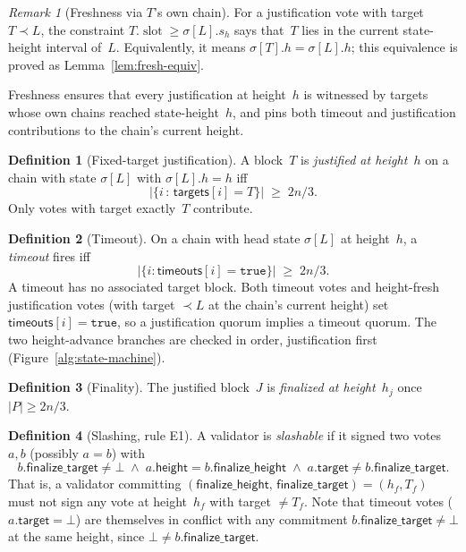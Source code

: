 \ifx\litemode\undefined\documentclass{article}\fi
\newcommand{\slot}[0]{\ensuremath{\operatorname{\mathrm{slot}}}}
\newcommand{\target}{\mathsf{target}}
\newcommand{\height}{\mathsf{height}}
\newcommand{\finalizeHeight}{\mathsf{finalize\_height}}
\newcommand{\finalizeTarget}{\mathsf{finalize\_target}}
\newcommand{\targets}{\mathsf{targets}}
\newcommand{\timeouts}{\mathsf{timeouts}}
\theoremstyle{plain}
\theoremstyle{definition}
\newtheorem{definition}{Definition}
\theoremstyle{remark}
\newtheorem{remark}[theorem]{Remark}
\begin{document}
\begin{remark}[Freshness via $T$'s own chain]
For a justification vote with target $T \prec L$, the constraint $T.\slot \geq \sigma[L].s_h$ says that~$T$ lies in the current state-height interval of~$L$.
Equivalently, it means $\sigma[T].h = \sigma[L].h$; this equivalence is proved as Lemma~\ref{lem:fresh-equiv}.
\end{remark}

Freshness ensures that every justification at height~$h$ is witnessed by targets whose own chains reached state-height~$h$, and pins both timeout and justification contributions to the chain's current height.

\begin{definition}[Fixed-target justification]\label{def:justification}
A block~$T$ is \emph{justified at height~$h$} on a chain with state $\sigma[L]$ with $\sigma[L].h = h$ iff
\[
  \bigl|\{i \,:\, \targets[i] = T\}\bigr| \;\geq\; 2n/3.
\]
Only votes with target exactly~$T$ contribute.
\end{definition}

\begin{definition}[Timeout]\label{def:timeout}
On a chain with head state $\sigma[L]$ at height~$h$, a \emph{timeout} fires iff
\[
  \bigl|\{i : \timeouts[i] = \mathtt{true}\}\bigr| \;\geq\; 2n/3.
\]
A timeout has no associated target block.
Both timeout votes and height-fresh justification votes (with target $\prec L$ at the chain's current height) set $\timeouts[i] = \mathtt{true}$, so a justification quorum implies a timeout quorum.
The two height-advance branches are checked in order, justification first (Figure~\ref{alg:state-machine}).
\end{definition}

\begin{definition}[Finality]\label{def:finality}
The justified block~$J$ is \emph{finalized at height~$h_j$} once $|P| \geq 2n/3$.
\end{definition}

\begin{definition}[Slashing, rule E1]\label{def:slashing}
A validator is \emph{slashable} if it signed two votes~$a, b$ (possibly $a = b$) with
\[
  b.\finalizeTarget \neq \bot \;\wedge\; a.\height = b.\finalizeHeight \;\wedge\; a.\target \neq b.\finalizeTarget.
\]
That is, a validator committing $(\finalizeHeight,\, \finalizeTarget) = (h_f, T_f)$ must not sign any vote at height~$h_f$ with target $\neq T_f$.
Note that timeout votes ($a.\target = \bot$) are themselves in conflict with any commitment $b.\finalizeTarget \neq \bot$ at the same height, since $\bot \neq b.\finalizeTarget$.
\end{definition}
\end{document}
